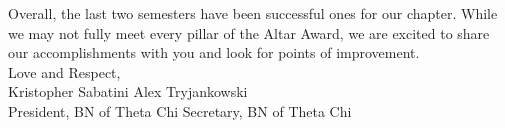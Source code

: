 Overall, the last two semesters have been successful ones for our chapter. While we may not fully meet every pillar of the Altar Award, we are excited to share our accomplishments with you and look for points of improvement. \\

Love and Respect, \\
Kristopher Sabatini         Alex Tryjankowski \\
President, BN of Theta Chi  Secretary, BN of Theta Chi \\
